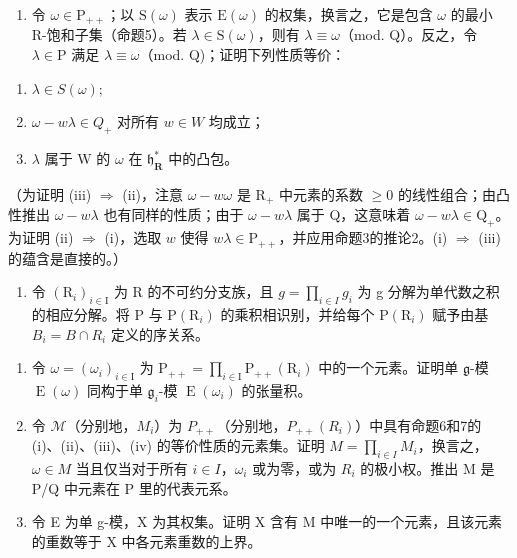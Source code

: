 \begin{enumerate}
\def\labelenumi{\arabic{enumi})}
\tightlist
\item
  令 \(\omega \in \mathrm{P}_{++}\)；以 \(\mathrm{S}(\omega)\) 表示 \(\mathrm{E}(\omega)\) 的权集，换言之，它是包含 \(\omega\) 的最小 R-饱和子集（命题5）。若 \(\lambda \in \mathrm{S}(\omega)\)，则有 \(\lambda \equiv \omega\)（mod. Q）。反之，令 \(\lambda \in \mathrm{P}\) 满足 \(\lambda \equiv \omega\)（mod. Q)；证明下列性质等价：
\end{enumerate}

\begin{enumerate}
\def\labelenumi{(\roman{enumi})}
\item
  \(\lambda \in S(\omega);\)
\item
  \(\omega - w\lambda \in Q_{+}\) 对所有 \(w \in W\) 均成立；
\item
  \(\lambda\) 属于 W 的 \(\omega\) 在 \(\mathfrak{h}_{\mathbf{R}}^{*}\) 中的凸包。
\end{enumerate}

（为证明 (iii) \(\Longrightarrow\) (ii)，注意 \(\omega - w\omega\) 是 \(\mathrm{R}_{+}\) 中元素的系数 \(\geq 0\) 的线性组合；由凸性推出 \(\omega - w\lambda\) 也有同样的性质；由于 \(\omega - w\lambda\) 属于 Q，这意味着 \(\omega - w\lambda \in \mathrm{Q}_{+}\)。为证明 (ii) \(\Longrightarrow\) (i)，选取 \(w\) 使得 \(w\lambda \in \mathrm{P}_{++}\)，并应用命题3的推论2。(i) \(\Longrightarrow\) (iii) 的蕴含是直接的。）

\begin{enumerate}
\def\labelenumi{\arabic{enumi})}
\setcounter{enumi}{1}
\tightlist
\item
  令 \((\mathrm{R}_{i})_{i\in\mathrm{I}}\) 为 R 的不可约分支族，且 \(g=\prod_{i\in I}g_{i}\) 为 g 分解为单代数之积的相应分解。将 P 与 \(\mathrm{P}(\mathrm{R}_{i})\) 的乘积相识别，并给每个 \(\mathrm{P}(\mathrm{R}_{i})\) 赋予由基 \(B_{i}=B\cap R_{i}\) 定义的序关系。
\end{enumerate}

\begin{enumerate}
\def\labelenumi{\alph{enumi})}
\item
  令 \(\omega = (\omega_{i})_{i\in \mathrm{I}}\) 为 \(\mathrm{P}_{++} = \prod_{i\in \mathrm{I}}\mathrm{P}_{++}(\mathrm{R}_i)\) 中的一个元素。证明单 \(\mathfrak{g}\)-模 \(\operatorname {E}(\omega)\) 同构于单 \(\mathfrak{g}_i\)-模 \(\operatorname {E}(\omega_i)\) 的张量积。
\item
  令 \(\mathcal{M}\)（分别地，\(M_{i}\)）为 \(P_{++}\)（分别地，\(P_{++}(R_{i})\)）中具有命题6和7的 (i)、(ii)、(iii)、(iv) 的等价性质的元素集。证明 \(M = \prod_{i \in I} M_{i}\)，换言之，\(\omega \in M\) 当且仅当对于所有 \(i \in I\)，\(\omega_{i}\) 或为零，或为 \(R_{i}\) 的极小权。推出 M 是 P/Q 中元素在 P 里的代表元系。
\item
  令 E 为单 g-模，X 为其权集。证明 X 含有 M 中唯一的一个元素，且该元素的重数等于 X 中各元素重数的上界。
\end{enumerate}

